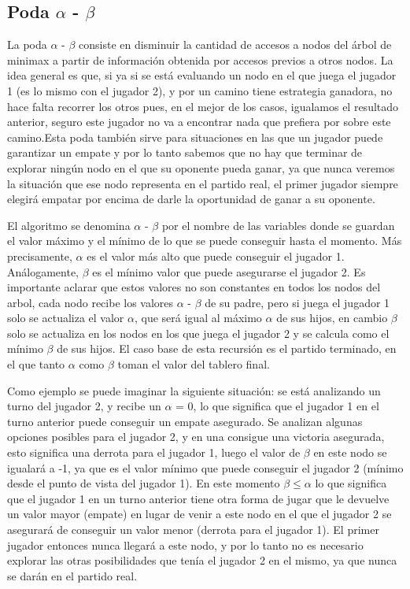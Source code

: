 \documentclass[A4paper,oneside,fleqn,11pt]{article}
\theoremstyle{definition}
\begin{document}
\subsection{Poda $\alpha$ - $\beta$}

La poda $\alpha$ - $\beta$ consiste en disminuir la cantidad de accesos a nodos del árbol de minimax a partir de información obtenida por accesos previos a otros nodos. La idea general es que, si ya si se está evaluando un nodo en el que juega el jugador 1 (es lo mismo con el jugador 2), y por un camino tiene estrategia ganadora, no hace falta recorrer los otros pues, en el mejor de los casos, igualamos el resultado anterior, seguro este jugador no va a encontrar nada que prefiera por sobre este camino.Esta poda también sirve para situaciones en las que un jugador puede garantizar un empate y por lo tanto sabemos que no hay que terminar de explorar ningún nodo en el que su oponente pueda ganar, ya que nunca veremos la situación que ese nodo representa en el partido real, el primer jugador siempre elegirá empatar por encima de darle la oportunidad de ganar a su oponente.

El algoritmo se denomina $\alpha$ - $\beta$ por el nombre de las variables donde se guardan el valor máximo y el mínimo de lo que se puede conseguir hasta el momento. Más precisamente, $\alpha$ es el valor más alto que puede conseguir el jugador 1. Análogamente, $\beta$ es el mínimo valor que puede asegurarse el jugador 2. Es importante aclarar que estos valores no son constantes en todos los nodos del arbol, cada nodo recibe los valores  $\alpha$ - $\beta$ de su padre, pero si juega el jugador 1 solo se actualiza el valor  $\alpha$, que será igual al máximo  $\alpha$ de sus hijos, en cambio  $\beta$ solo se actualiza en los nodos en los que juega el jugador 2 y se calcula como el mínimo $\beta$ de sus hijos. El caso base de esta recursión es el partido terminado, en el que tanto $\alpha$ como $\beta$ toman el valor del tablero final.

Como ejemplo se puede imaginar la siguiente situación: se está analizando un turno del jugador 2, y recibe un $\alpha$ = 0, lo que significa que el jugador 1 en el turno anterior puede conseguir un empate asegurado. Se analizan algunas opciones posibles para el jugador 2, y en una consigue una victoria asegurada, esto significa una derrota para el jugador 1, luego el valor de $\beta$ en este nodo se igualará a -1, ya que es el valor mínimo que puede conseguir el jugador 2 (mínimo desde el punto de vista del jugador 1). En este momento $\beta  \leq \alpha$ lo que significa que el jugador 1 en un turno anterior tiene otra forma de jugar que le devuelve un valor mayor (empate) en lugar de venir a este nodo en el que el jugador 2 se asegurará de conseguir un valor menor (derrota para el jugador 1). El primer jugador entonces nunca llegará a este nodo, y por lo tanto no es necesario explorar las otras posibilidades que tenía el jugador 2 en el mismo, ya que nunca se darán en el partido real.
\end{document}
